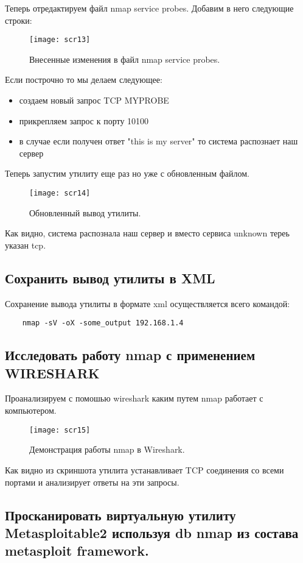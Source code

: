 \documentclass{article}
\begin{document}
  Теперь отредактируем файл nmap service probes. Добавим в него следующие строки:
  \begin{figure}[h!]
  	\centering
  	\texttt{[image: scr13]}
  	\caption{Внесенные изменения в файл nmap service probes.}
  \end{figure}
 
 
 Если построчно то мы делаем следующее:
 \begin{itemize}
 	\item создаем новый запрос TCP MYPROBE
 	\item прикрепляем запрос к порту 10100
 	\item в случае если получен ответ "this is my server" то система распознает наш сервер 
 \end{itemize}
 
 Теперь запустим утилиту еще раз но уже с обновленным файлом.
 \begin{figure}[h!]
 	\centering
 	\texttt{[image: scr14]}
 	\caption{Обновленный вывод утилиты.}
 \end{figure}
 Как видно, система распознала наш сервер и вместо сервиса unknown тереь указан tcp.
 
 \subsection{Сохранить вывод утилиты в XML}
 
 Сохранение вывода утилиты в формате xml  осуществляется всего командой:
 \begin{verbatim}
 	nmap -sV -oX -some_output 192.168.1.4
 \end{verbatim}
 
 \subsection{Исследовать работу nmap  с применением WIRESHARK}
 Проанализируем с помошью wireshark каким путем nmap работает с компьютером.
 
  \begin{figure}[h!]
  	\centering
  	\texttt{[image: scr15]}
  	\caption{Демонстрация работы nmap в Wireshark.}
  \end{figure}
  
  Как видно из скриншота утилита устанавливает TCP соединения со всеми портами и анализирует ответы на эти запросы.
 
 \subsection{Просканировать виртуальную утилиту Metasploitable2 используя db nmap из состава metasploit framework.\\}
 
\end{document}
